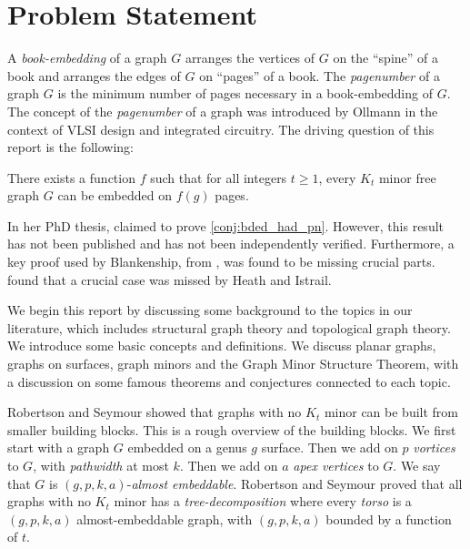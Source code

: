 \section{Problem Statement}

A \textit{book-embedding} of a graph $G$ arranges the vertices of $G$ on the ``spine'' of a book and arranges the edges of $G$ on ``pages'' of a book. The \textit{pagenumber} of a graph \(G\) is the minimum number of pages necessary in a book-embedding of \(G\). The concept of the \textit{pagenumber} of a graph was introduced by Ollmann \cite{ollmannBookThicknessVarious1973} in the context of VLSI design and integrated circuitry. 
The driving question of this report is the following:
\begin{conjecture}\label{conj:bded_had_pn}
	There exists a function $f$ such that for all integers $t \geq 1$, every $K_t$ minor free graph $G$ can be embedded on $f(g)$ pages.
\end{conjecture}

In her PhD thesis, \textcite{Blankenship-PhD03} claimed to prove \cref{conj:bded_had_pn}. However, this result has not been published and has not been independently verified. Furthermore, a key proof used by Blankenship, from \textcite{heathPagenumberGenusGraphs1992}, was found to be missing crucial parts. \textcite{nakamotoBookEmbeddingProjectiveplanar2015} found that a crucial case was missed by Heath and Istrail.

We begin this report by discussing some background to the topics in our literature, which includes structural graph theory and topological graph theory. We introduce some basic concepts and definitions. We discuss planar graphs, graphs on surfaces, graph minors and the Graph Minor Structure Theorem, with a discussion on some famous theorems and conjectures connected to each topic. 

Robertson and Seymour showed that graphs with no \(K_t\) minor can be built from smaller building blocks. This is a rough overview of the building blocks. We first start with a graph \(G\) embedded on a genus \(g\) surface. Then we add on \(p\) \textit{vortices} to \(G\), with \textit{pathwidth} at most \(k\). Then we add on \(a\) \textit{apex vertices} to \(G\). We say that \(G\) is \((g, p, k, a)\)-\textit{almost embeddable}. Robertson and Seymour \cite{robertsonGraphMinorsXVI2003} proved that all graphs with no \(K_t\) minor has a \textit{tree-decomposition} where every \textit{torso} is a \((g, p, k, a)\) almost-embeddable graph, with \((g, p, k, a)\) bounded by a function of \(t\).

